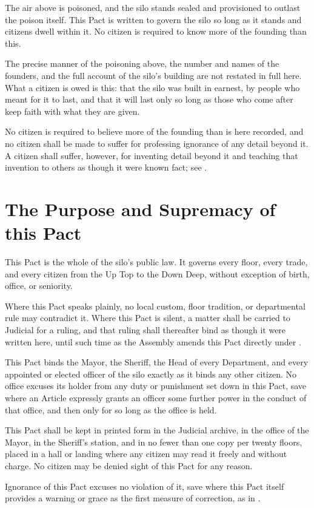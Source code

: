 \begin{clauses}
\item The air above is poisoned, and the silo stands sealed and provisioned to outlast the poison itself. This Pact is written to govern the silo so long as it stands and citizens dwell within it. No citizen is required to know more of the founding than this.
\item The precise manner of the poisoning above, the number and names of the founders, and the full account of the silo's building are not restated in full here. What a citizen is owed is this: that the silo was built in earnest, by people who meant for it to last, and that it will last only so long as those who come after keep faith with what they are given.
\item No citizen is required to believe more of the founding than is here recorded, and no citizen shall be made to suffer for professing ignorance of any detail beyond it. A citizen shall suffer, however, for inventing detail beyond it and teaching that invention to others as though it were known fact; see .
\end{clauses}

\section{The Purpose and Supremacy of this Pact}
\label{sec:founding:purpose-and-supremacy-of-this-pact}

This Pact is the whole of the silo's public law. It governs every floor, every trade, and every citizen from the Up Top to the Down Deep, without exception of birth, office, or seniority.

\begin{clauses}
\item Where this Pact speaks plainly, no local custom, floor tradition, or departmental rule may contradict it. Where this Pact is silent, a matter shall be carried to Judicial for a ruling, and that ruling shall thereafter bind as though it were written here, until such time as the Assembly amends this Pact directly under .
\item This Pact binds the Mayor, the Sheriff, the Head of every Department, and every appointed or elected officer of the silo exactly as it binds any other citizen. No office excuses its holder from any duty or punishment set down in this Pact, save where an Article expressly grants an officer some further power in the conduct of that office, and then only for so long as the office is held.
\item This Pact shall be kept in printed form in the Judicial archive, in the office of the Mayor, in the Sheriff's station, and in no fewer than one copy per twenty floors, placed in a hall or landing where any citizen may read it freely and without charge. No citizen may be denied sight of this Pact for any reason.
\item Ignorance of this Pact excuses no violation of it, save where this Pact itself provides a warning or grace as the first measure of correction, as in .
\end{clauses}

